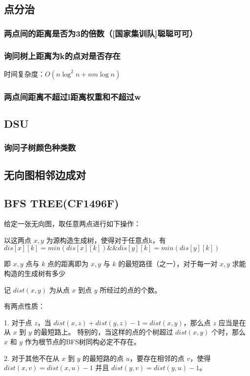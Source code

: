 \documentclass[twoside,a4paper]{article}
\begin{document}
\subsection{点分治}
\subsubsection{两点间的距离是否为3的倍数（[国家集训队]聪聪可可）}


\subsubsection{询问树上距离为k的点对是否存在}
时间复杂度：$O(n \log^{2} n + nm \log n)$


\subsubsection{两点间距离不超过l距离权重和不超过w}


\subsection{DSU}
\subsubsection{询问子树颜色种类数}


\subsection{无向图相邻边成对}


\subsection{BFS TREE(CF1496F)}
给定一张无向图，取任意两点进行如下操作： \par
以这两点 $x,y$ 为源构造生成树，使得对于任意点k，有$dis[x][k]=min(dis[x][k])\&\&dis[y][k]=min(dis[y][k])$ \par
即 $x,y$ 点与 $k$ 点的距离即为 $x,y$ 与 $k$ 的最短路径（之一），对于每一对 $x,y$ 求能构造的生成树有多少 \par

\par
记 $dist(x,y)$ 为从点 $x$ 到点 $y$ 所经过的点的个数。 \par
有两点性质： \par
1. 对于点 $z$，当 $dist(x,z)+dist(y,z)-1=dist(x,y)$，那么点 $z$ 应当是在从 $x$ 到 $y$ 的最短路上。
  特别的，当这样的点的个树超过 $dist(x,y)$ 个时，那么 $x$ 和 $y$ 作为根节点的BFS树同构必定不存在。 \par
2. 对于其他不在从 $x$ 到 $y$ 的最短路的点 $u$，要存在相邻的点 $v$，使得 $dist(x,v)=dist(x,u)-1$ 并且 $dist(y,v)=dist(y,u)-1$。 \par
\end{document}
